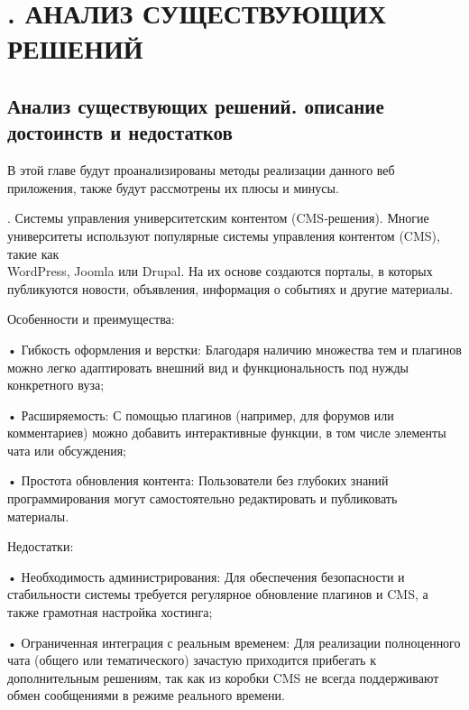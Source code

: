 \sectionbreak \section*{
	\cyrillicfont 
	\fontsize{14pt}{0pt}\selectfont
	\englishfont 
	. АНАЛИЗ СУЩЕСТВУЮЩИХ РЕШЕНИЙ
}

\titlespace
\subsection*{ 
	\gostTitleFont
	 Анализ существующих решений. описание достоинств и недостатков
} 
{\gostFont
	
	\par \redline В этой главе будут проанализированы методы реализации данного веб приложения, также будут рассмотрены их плюсы и минусы. 
	
	\par {}. Системы управления университетским контентом (CMS‑решения). Многие университеты используют популярные системы управления контентом (CMS), такие как \\ WordPress, Joomla или Drupal. На их основе создаются порталы, в которых публикуются новости, объявления, информация о событиях и другие материалы.
	
	\par \redline Особенности и преимущества:
	
	\par \redline • Гибкость оформления и верстки: Благодаря наличию множества тем и плагинов можно легко адаптировать внешний вид и функциональность под нужды конкретного вуза;
	
	\par \redline • Расширяемость: С помощью плагинов (например, для форумов или комментариев) можно добавить интерактивные функции, в том числе элементы чата или обсуждения;
	
	\par \redline • Простота обновления контента: Пользователи без глубоких знаний программирования могут самостоятельно редактировать и публиковать материалы.
	
	\par \redline Недостатки:
	
	\par \redline • Необходимость администрирования: Для обеспечения безопасности и стабильности системы требуется регулярное обновление плагинов и CMS, а также грамотная настройка хостинга;
	
	\par \redline • Ограниченная интеграция с реальным временем: Для реализации полноценного чата (общего или тематического) зачастую приходится прибегать к дополнительным решениям, так как из коробки CMS не всегда поддерживают обмен сообщениями в режиме реального времени. 
	
}
